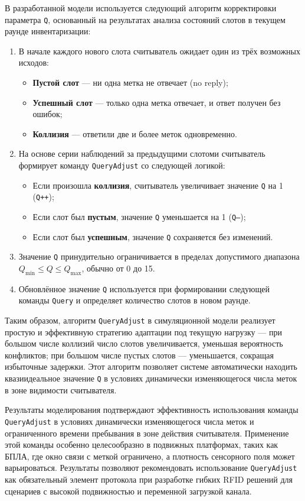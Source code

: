 \documentclass[12pt]{article}
\theoremstyle{definition}
\begin{document}
В разработанной модели используется следующий алгоритм корректировки параметра \texttt{Q}, основанный на результатах анализа состояний слотов в текущем раунде инвентаризации:

\begin{enumerate}
\item В начале каждого нового слота считыватель ожидает один из трёх возможных исходов:
\begin{itemize}
\item \textbf{Пустой слот} — ни одна метка не отвечает (no reply);
\item \textbf{Успешный слот} — только одна метка отвечает, и ответ получен без ошибок;
\item \textbf{Коллизия} — ответили две и более меток одновременно.
\end{itemize}
\item На основе серии наблюдений за предыдущими слотоми считыватель формирует команду \texttt{QueryAdjust} со следующей логикой:
\begin{itemize}
\item Если произошла \textbf{коллизия}, считыватель увеличивает значение \texttt{Q} на 1 (\texttt{Q++});
\item Если слот был \textbf{пустым}, значение \texttt{Q} уменьшается на 1 (\texttt{Q–});
\item Если слот был \textbf{успешным}, значение \texttt{Q} сохраняется без изменений.
\end{itemize}
\item Значение \texttt{Q} принудительно ограничивается в пределах допустимого диапазона \(Q_{\min} \leq Q \leq Q_{\max}\), обычно от 0 до 15.
\item Обновлённое значение \texttt{Q} используется при формировании следующей команды \texttt{Query} и определяет количество слотов в новом раунде.
\end{enumerate}

Таким образом, алгоритм \texttt{QueryAdjust} в симуляционной модели реализует простую и эффективную стратегию адаптации под текущую нагрузку — при большом числе коллизий число слотов увеличивается, уменьшая вероятность конфликтов; при большом числе пустых слотов — уменьшается, сокращая избыточные задержки. Этот алгоритм позволяет системе автоматически находить квазиидеальное значение \texttt{Q} в условиях динамически изменяющегося числа меток в зоне видимости считывателя.

Результаты моделирования подтверждают эффективность использования команды \texttt{QueryAdjust} в условиях динамически изменяющегося числа меток и ограниченного времени пребывания в зоне действия считывателя. Применение этой команды особенно целесообразно в подвижных платформах, таких как БПЛА, где окно связи с меткой ограничено, а плотность сенсорного поля может варьироваться. Результаты позволяют рекомендовать использование \texttt{QueryAdjust} как обязательный элемент протокола при разработке гибких RFID решений для сценариев с высокой подвижностью и переменной загрузкой канала.
\end{document}
